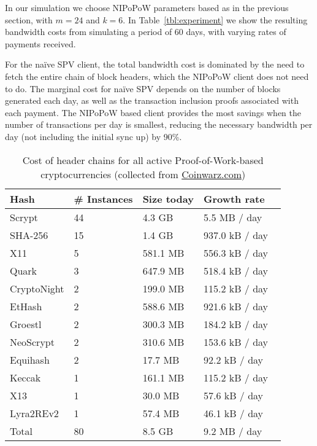  In our simulation we choose NIPoPoW parameters based as in the previous section, with $m=24$ and $k=6$.
In Table~\ref{tbl:experiment} we show the resulting bandwidth costs from simulating a period of 60 days, with varying rates of payments received.

 For the na\"ive SPV client, the total bandwidth cost is dominated by the need to fetch the entire chain of block headers, which the NIPoPoW client does not need to do. The marginal cost for na\"ive SPV depends on the number of blocks generated each day, as well as the transaction inclusion proofs associated with each payment. The NIPoPoW based client provides the most savings when the number of transactions per day is smallest, reducing the necessary bandwidth per day (not including the initial sync up) by 90\%.

\begin{table}
  \caption{Cost of header chains for all active Proof-of-Work-based cryptocurrencies (collected from \url{Coinwarz.com})}
  \label{tbl:currencies}
  \small
  \centering
  \begin{tabular}{l|l|l|l}
    {\bf Hash} & {\bf \# Instances} & {\bf Size today} & {\bf Growth rate}  \\
    \hline
    Scrypt  & 44  & 4.3 GB  & 5.5 MB / day \  \\
    SHA-256  & 15  & 1.4 GB  & 937.0 kB / day \  \\
    X11  & 5  & 581.1 MB  & 556.3 kB / day \  \\
    Quark  & 3  & 647.9 MB  & 518.4 kB / day \  \\
    CryptoNight  & 2  & 199.0 MB  & 115.2 kB / day \  \\
    EtHash  & 2  & 588.6 MB  & 921.6 kB / day \  \\
    Groestl  & 2  & 300.3 MB  & 184.2 kB / day \  \\
    NeoScrypt  & 2  & 310.6 MB  & 153.6 kB / day \  \\
    Equihash  & 2  & 17.7 MB  & 92.2 kB / day \  \\
    Keccak  & 1  & 161.1 MB  & 115.2 kB / day \  \\
    X13  & 1  & 30.0 MB  & 57.6 kB / day \  \\
    Lyra2REv2  & 1  & 57.4 MB  & 46.1 kB / day \  \\
    \hline
    Total  & 80   &  8.5 GB  & 9.2 MB  / day  \\
  \end{tabular}
\end{table}



